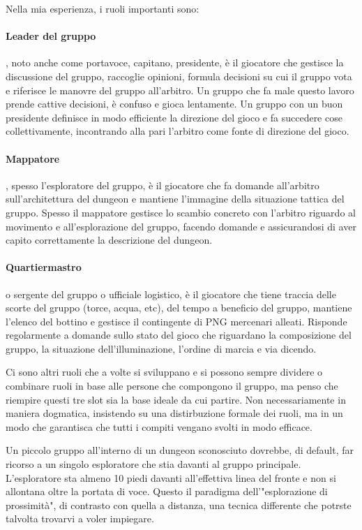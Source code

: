 Nella mia esperienza, i ruoli importanti sono:

\paragraph{Leader del gruppo}, noto anche come portavoce, capitano, presidente, è il giocatore che gestisce la discussione del gruppo, raccoglie opinioni, formula decisioni su cui il gruppo vota e riferisce le manovre del gruppo all'arbitro. Un gruppo che fa male questo lavoro prende cattive decisioni, è confuso e gioca lentamente. Un gruppo con un buon presidente definisce in modo efficiente la direzione del gioco e fa succedere cose collettivamente, incontrando alla pari l'arbitro come fonte di direzione del gioco.

\paragraph{Mappatore}, spesso l'esploratore del gruppo, è il giocatore che fa domande all'arbitro sull'architettura del dungeon e mantiene l'immagine della situazione tattica del gruppo. Spesso il mappatore gestisce lo scambio concreto con l'arbitro riguardo al movimento e all'esplorazione del gruppo, facendo domande e assicurandosi di aver capito correttamente la descrizione del dungeon.

\paragraph{Quartiermastro} o sergente del gruppo o ufficiale logistico, è il giocatore che tiene traccia delle scorte del gruppo (torce, acqua, etc), del tempo a beneficio del gruppo, mantiene l'elenco del bottino e gestisce il contingente di PNG mercenari alleati. Risponde regolarmente a domande sullo stato del gioco che riguardano la composizione del gruppo, la situazione dell'illuminazione, l'ordine di marcia e via dicendo.

Ci sono altri ruoli che a volte si sviluppano e si possono sempre dividere o combinare ruoli in base alle persone che compongono il gruppo, ma penso che riempire questi tre slot sia la base ideale da cui partire. Non necessariamente in maniera dogmatica, insistendo su una distirbuzione formale dei ruoli, ma in un modo che garantisca che tutti i compiti vengano svolti in modo efficace.


Un piccolo gruppo all'interno di un dungeon sconosciuto dovrebbe, di default, far ricorso a un singolo esploratore che stia davanti al gruppo principale. L'esploratore sta almeno 10 piedi davanti all'effettiva linea del fronte e non si allontana oltre la portata di voce. Questo il paradigma dell'"esplorazione di prossimità", di contrasto con quella a distanza, una tecnica differente che potrste talvolta trovarvi a voler impiegare.

